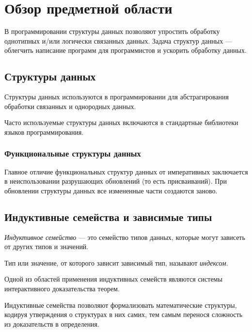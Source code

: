 \chapter{Обзор предметной области}
\label{chapter1}

% 
%
%
В программировании структуры данных позволяют упростить обработку
однотипных и/или логически связанных данных.
Задача структур данных — облегчить написание программ для программистов и
ускорить обработку данных.

\section{Структуры данных}
Структуры данных используются в программировании для абстрагирования
обработки связанных и однородных данных.

Часто используемые структуры данных включаются в стандартные библиотеки
языков программирования.

\subsection{Функциональные структуры данных}

Главное отличие функциональных структур данных от императивных \cite{OkasakiBook}
заключается в неиспользовании разрушающих обновлений (то есть присваиваний).
При обновлении структуры данных все измененные части создаются заново.

\section{Индуктивные семейства и зависимые типы}

\begin{definition}
\emph{Индуктивное семейство} \cite{DybjerIndFam}— это семейство типов данных,
которые могут зависеть от других типов и значений.

Тип или значение, от которого зависит зависимый тип, называют \emph{индексом}.
\end{definition}

Одной из областей применения индуктивных семейств являются системы интерактивного
доказательства теорем.

Индуктивные семейства позволяют формализовать математические структуры,
кодируя утверждения о структурах в них самих, тем самым перенося сложность из
доказательств в определения.

